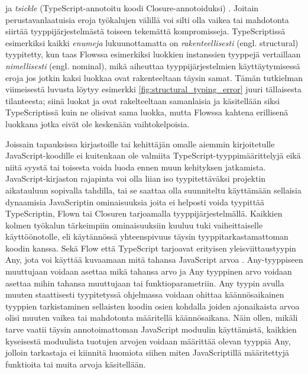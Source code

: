 ja \textit{tsickle} (TypeScript-annotoitu koodi Closure-annotoiduksi) \cite{Tsickle}.
Joitain perustavanlaatuisia eroja työkalujen välillä voi silti olla vaikea
tai mahdotonta siirtää tyyppijärjestelmästä toiseen tekemättä kompromisseja.
TypeScriptissä esimerkiksi kaikki \textit{enumeja} lukuunottamatta on
\textit{rakenteellisesti} (engl. structural) tyypitetty, kun taas Flowssa 
esimerkiksi luokkien instanssien tyyppejä vertaillaan \textit{nimellisesti}
(engl. nominal), mikä aiheuttaa tyyppijärjestelmien käyttäytymisessä eroja
jos jotkin kaksi luokkaa ovat rakenteeltaan täysin samat. Tämän tutkielman
viimeisestä luvusta löytyy esimerkki \ref{fig:structural_typing_error}
juuri tällaisesta tilanteesta; siinä luokat  ja
 ovat rakelteeltaan samanlaisia ja käsitellään siksi
TypeScriptissä kuin ne olisivat sama luokka, mutta Flowssa kahtena
erillisenä luokkana jotka eivät ole keskenään vaihtokelpoisia. 

Joissain tapauksissa kirjastoille tai kehittäjän omalle aiemmin kirjoitetulle
JavaScript-koodille ei kuitenkaan ole valmiita TypeScript-tyyppimäärittelyjä
eikä niitä syystä tai toisesta voida luoda ennen muun kehityksen jatkamista.
JavaScript-kirjaston rajapinta voi olla liian iso tyypitettäväksi projektin
aikatauluun sopivalla tahdilla, tai se saattaa olla suunniteltu käyttämään
sellaisia dynaamisia JavaScriptin ominaisuuksia joita ei helposti voida
tyypittää TypeScriptin, Flown tai Closuren tarjoamalla tyyppijärjestelmällä.
Kaikkien kolmen työkalun tärkeimpiin ominaisuuksiin kuuluu tuki vaiheittaiselle
käyttöönotolle, eli käytännössä yhteenspivuus täysin tyyppitarkastamattoman
koodin kanssa. Sekä Flow että TypeScript tarjoavat erityisen
yleisviittaustyypin Any, jota voi käyttää kuvaamaan mitä tahansa JavaScript
arvoa \cite{TypeScriptSpec}. Any-tyyppiseen muuttujaan voidaan asettaa mikä
tahansa arvo ja Any tyyppinen arvo voidaan asettaa mihin tahansa muuttujaan
tai funktioparametriin. Any tyypin avulla muuten staattisesti tyypitetyssä
ohjelmassa voidaan ohittaa käännösaikainen tyyppien tarkistaminen sellaisten
koodin osien kohdalla joiden ajonaikaista arvoa olisi muuten vaikea tai
mahdotonta määritellä käännösaikana. Näin ollen, mikäli tarve vaatii täysin
annotoimattoman JavaScript moduulin käyttämistä, kaikkien kyseisestä moduulista
tuotujen arvojen voidaan määrittää olevan tyyppiä Any, jolloin tarkastaja ei
kiinnitä huomiota siihen miten JavaScriptillä määritettyjä funktioita tai
muita arvoja käsitellään.